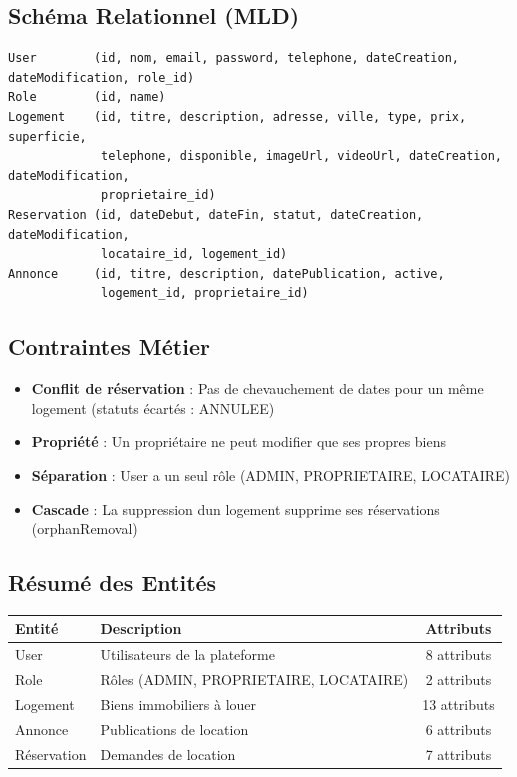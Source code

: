\documentclass[12pt,a4paper]{article}
\begin{document}
\subsection{Sch\'ema Relationnel (MLD)}

\begin{tcolorbox}[colback=white, colframe=reprimary!40]
\begin{verbatim}
User        (id, nom, email, password, telephone, dateCreation, dateModification, role_id)
Role        (id, name)
Logement    (id, titre, description, adresse, ville, type, prix, superficie,
             telephone, disponible, imageUrl, videoUrl, dateCreation, dateModification,
             proprietaire_id)
Reservation (id, dateDebut, dateFin, statut, dateCreation, dateModification,
             locataire_id, logement_id)
Annonce     (id, titre, description, datePublication, active,
             logement_id, proprietaire_id)
\end{verbatim}
\end{tcolorbox}

\subsection{Contraintes M\'etier}

\begin{itemize}
  \item \textbf{Conflit de r\'eservation} : Pas de chevauchement de dates pour un m\^eme logement (statuts \'ecart\'es : ANNULEE)
  \item \textbf{Propri\'et\'e} : Un propri\'etaire ne peut modifier que ses propres biens
  \item \textbf{S\'eparation} : User a un seul r\^ole (ADMIN, PROPRIETAIRE, LOCATAIRE)
  \item \textbf{Cascade} : La suppression d\textquotesingle un logement supprime ses r\'eservations (orphanRemoval)
\end{itemize}

\subsection{R\'esum\'e des Entit\'es}

\begin{center}
\begin{tabular}{llc}
\toprule
\textbf{Entit\'e} & \textbf{Description} & \textbf{Attributs} \\
\midrule
User & Utilisateurs de la plateforme & 8 attributs \\
Role & R\^oles (ADMIN, PROPRIETAIRE, LOCATAIRE) & 2 attributs \\
Logement & Biens immobiliers \`a louer & 13 attributs \\
Annonce & Publications de location & 6 attributs \\
R\'eservation & Demandes de location & 7 attributs \\
\bottomrule
\end{tabular}
\end{center}
\end{document}
